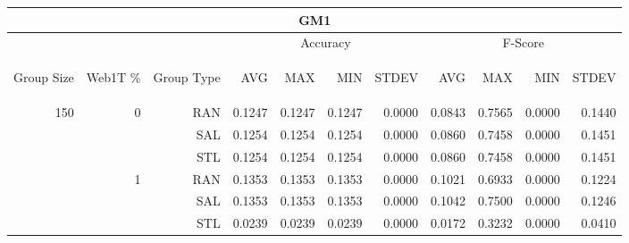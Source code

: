 \begin{center}
\begin{table}[htbp] 
 \begin{center}
\begin{tabular}{ | r | r | r | r | r | r | r | r | r | r | r |}
\hline
\multicolumn{11}{|c|}{GM1}\\
\hline
 & & & \multicolumn{4}{|c|}{Accuracy} & \multicolumn{4}{|c|}{F-Score}\\ \cline{4-11}
\begin{sideways}Group Size\end{sideways} & \begin{sideways}Web1T \%\end{sideways} & \begin{sideways}Group Type\end{sideways} & \begin{sideways}AVG\end{sideways} & \begin{sideways}MAX\end{sideways} & \begin{sideways}MIN\end{sideways} & \begin{sideways}STDEV\end{sideways} & \begin{sideways}AVG\end{sideways} & \begin{sideways}MAX\end{sideways} & \begin{sideways}MIN\end{sideways} & \begin{sideways}STDEV\end{sideways}\\
\hline
\multirow{18}{*}{150}
 & \multirow{3}{*}{0} & RAN & 0.1247 & 0.1247 & 0.1247 & 0.0000 & 0.0843 & 0.7565 & 0.0000 & 0.1440\\ \cline{3-11}
 &   & SAL & 0.1254 & 0.1254 & 0.1254 & 0.0000 & 0.0860 & 0.7458 & 0.0000 & 0.1451\\ \cline{3-11}
 &   & STL & 0.1254 & 0.1254 & 0.1254 & 0.0000 & 0.0860 & 0.7458 & 0.0000 & 0.1451\\ \cline{2-11}
 & \multirow{3}{*}{1} & RAN & 0.1353 & 0.1353 & 0.1353 & 0.0000 & 0.1021 & 0.6933 & 0.0000 & 0.1224\\ \cline{3-11}
 &   & SAL & 0.1353 & 0.1353 & 0.1353 & 0.0000 & 0.1042 & 0.7500 & 0.0000 & 0.1246\\ \cline{3-11}
 &   & STL & 0.0239 & 0.0239 & 0.0239 & 0.0000 & 0.0172 & 0.3232 & 0.0000 & 0.0410\\ \cline{2-11}

\end{tabular}
\end{center}
\end{table}
\end{center}

